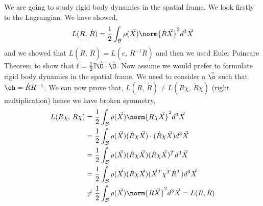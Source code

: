 \noindent
We are going to study rigid body dynamics in the spatial frame. We look firstly to the Lagrangian. We have showed,
$$ L(R,\,\dot R) = \frac{1}{2} \int_\mathcal{B} \rho(\vec X) \norm{\dot R \vec X}^2 d^3\vec X $$
and we showed that $L(R,\, \dot R) = L(e,\, R^{-1}\dot R)$ and then we used Euler Poincare Theorem to show that $\ell = \frac{1}{2}\mathbb{I}\vec\O \cdot \vec\O$. Now assume we would prefer to formulate rigid body dynamics in the spatial frame. We need to consider a $\vec\o$ such that $\oh = \dot R R^{-1}$. We can now prove that, $L(R,\,\dot R) \ne L(R\chi,\,\dot R\chi)$ (right multiplication) hence we have broken symmetry,
\begin{align*}
  L(R\chi,\,\dot R\chi) &= \frac{1}{2} \int_\mathcal{B} \rho(\vec X) \norm{\dot R \chi\vec X}^2 d^3\vec X \\
  &= \frac{1}{2} \int_\mathcal{B} \rho(\vec X) (\dot R \chi\vec X) \cdot (\dot R \chi\vec X) d^3\vec X \\
  &= \frac{1}{2} \int_\mathcal{B} \rho(\vec X) (\dot R \chi\vec X)  (\dot R \chi\vec X)^T d^3\vec X \\
  &= \frac{1}{2} \int_\mathcal{B} \rho(\vec X) (\dot R \chi\vec X)  (\vec X^T\chi^T\dot R^T) d^3\vec X \\
  &\ne \frac{1}{2} \int_\mathcal{B} \rho(\vec X) \norm{\dot R \vec X}^2 d^3\vec X = L(R, \dot R)
\end{align*}


